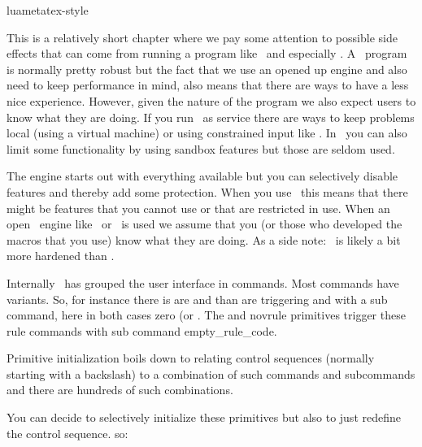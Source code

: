 
\environment luametatex-style

\startdocument[title=security]

\startsection[title=Introduction]

This is a relatively short chapter where we pay some attention to possible side
effects that can come from running a program like \TEX\ and especially
\LUAMETATEX. A \TEX\ program is normally pretty robust but the fact that we use
an opened up engine and also need to keep performance in mind, also means that
there are ways to have a less nice experience. However, given the nature of the
program we also expect users to know what they are doing. If you run \TEX\ as
service there are ways to keep problems local (using a virtual machine) or using
constrained input like \XML. In \CONTEXT\ you can also limit some functionality
by using sandbox features but those are seldom used.

The engine starts out with everything available but you can selectively disable
features and thereby add some protection. When you use \CONTEXT\ this means that
there might be features that you cannot use or that are restricted in use. When
an open \TEX\ engine like \LUATEX\ or \LUAMETATEX\ is used we assume that you (or
those who developed the macros that you use) know what they are doing. As a side
note: \LUAMETATEX\ is likely a bit more hardened than \LUATEX.

\stopsection

\startsection[title=Primitives]

Internally \TEX\ has grouped the user interface in commands. Most commands have
variants. So, for instance there is are  and  than are
triggering  and  with a sub command, here in
both cases zero (or . The  and \type
{novrule} primitives trigger these rule commands with sub command \typ
{empty_rule_code}.

Primitive initialization boils down to relating control sequences (normally
starting with a backslash) to a combination of such commands and subcommands and
there are hundreds of such combinations.

You can decide to selectively initialize these primitives but also to just
redefine the control sequence. so:

\starttyping[option=TEX]
\let\left\MyLeftCommand
\stoptyping

